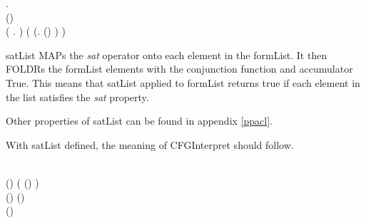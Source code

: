 \documentclass[../../main/main.tex]{subfiles}
\begin{document}
\begin{tabbing}
\parskip=8pt
\HOLTokenTurnstile{} \hspace{0.3cm}\HOLSymConst{\HOLTokenForall{}}   .\\
\hspace{0.5cm}(\HOLSymConst{,}\HOLSymConst{,})   \HOLSymConst{\HOLTokenEquiv{}} \\
\hspace{0.5cm}  (\HOLTokenLambda{} .  \HOLSymConst{\HOLTokenConj{}} )  ( (\HOLTokenLambda{}. (\HOLSymConst{,}\HOLSymConst{,})  ) )
\parskip=18pt
\end{tabbing}

satList MAPs the \textit{sat} operator onto each element in the formList. It then FOLDRs the formList elements with the conjunction function and accumulator True.  This means that satList applied to formList returns true if each element in the list satisfies the \textit{sat} property.

Other properties of satList can be found in appendix \ref{ppacl}.

With satList defined, the meaning of CFGInterpret should follow.  

\begin{tabbing}
\parskip=8pt
\HOLTokenTurnstile{} \\
\hspace{0.5cm}(\HOLSymConst{,}\HOLSymConst{,})
     (    (\HOLSymConst{::}) 
        ) \HOLSymConst{\HOLTokenEquiv{}} \\
\hspace{0.5cm}(\HOLSymConst{,}\HOLSymConst{,})    \HOLSymConst{\HOLTokenConj{}} (\HOLSymConst{,}\HOLSymConst{,})   \HOLSymConst{\HOLTokenConj{}}\\
\hspace{0.5cm}(\HOLSymConst{,}\HOLSymConst{,})    
\parskip=18pt
\end{tabbing}
\end{document}

